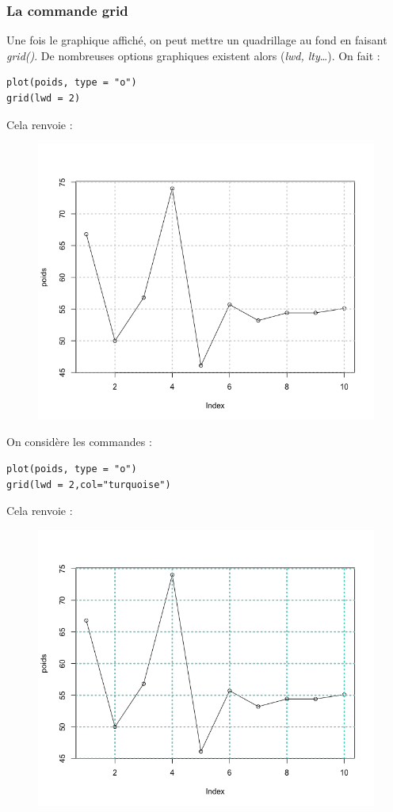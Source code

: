 \subsubsection{La commande grid}
Une fois le graphique affiché, on peut mettre un quadrillage au fond en faisant \textit{grid()}. De nombreuses options graphiques existent alors (\textit{lwd, lty}\dots).\newline
On fait :
\begin{lstlisting}[language=html]
plot(poids, type = "o")
grid(lwd = 2)
\end{lstlisting}
Cela renvoie :
\begin{figure}[H]\begin{center}\includegraphics[scale=0.4]{ilu/gra69.png}\end{center}\end{figure}
On considère les commandes :
\begin{lstlisting}[language=html]
plot(poids, type = "o")
grid(lwd = 2,col="turquoise")
\end{lstlisting}
Cela renvoie :
\begin{figure}[H]\begin{center}\includegraphics[scale=0.4]{ilu/gra70.png}\end{center}\end{figure}
